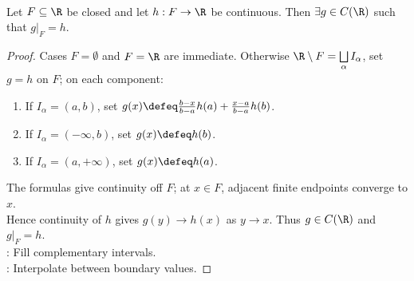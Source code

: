 \begin{lemma} \label{lem:real-line-continuous-extension-from-closed-set} \\
Let $F\subseteq\R$ be closed and let $h:F\to\R$ be continuous. Then $\exists g\in C(\R)$ such that $g|_F=h$.
\begin{proof} Cases $F=\emptyset$ and $F=\R$ are immediate. Otherwise $\R\setminus F=\bigsqcup\limits_\alpha I_\alpha$, set $g=h$ on $F$; on each component:
\begin{enumerate}[label=(\roman*)]
\setlength{\itemsep}{0pt}
\item If $I_\alpha=(a,b)$, set $g(x)\defeq\frac{b-x}{b-a}h(a)+\frac{x-a}{b-a}h(b)$.
\item If $I_\alpha=(-\infty,b)$, set $g(x)\defeq h(b)$.
\item If $I_\alpha=(a,+\infty)$, set $g(x)\defeq h(a)$.
\end{enumerate}
The formulas give continuity off $F$; at $x\in F$, adjacent finite endpoints converge to $x$.\\
Hence continuity of $h$ gives $g(y)\to h(x)$ as $y\to x$. Thus $g\in C(\R)$ and $g|_F=h$.\\
: Fill complementary intervals.\\
: Interpolate between boundary values.
\end{proof}
\end{lemma}

